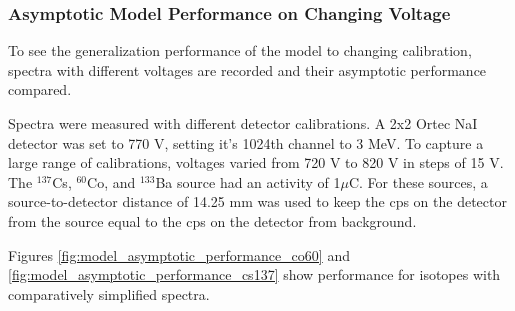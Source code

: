 \subsubsection{Asymptotic Model Performance on Changing Voltage}

To see the generalization performance of the model to changing calibration, spectra with different voltages are recorded and their asymptotic performance compared.

Spectra were measured with different detector calibrations. A 2x2 Ortec NaI detector was set to 770 V, setting it's 1024th channel to 3 MeV. To capture a large range of calibrations, voltages varied from 720 V to 820 V in steps of 15 V. The $^{137}$Cs, $^{60}$Co, and $^{133}$Ba source had an activity of 1$\mu$C. For these sources, a source-to-detector distance of 14.25 mm was used to keep the cps on the detector from the source equal to the cps on the detector from background.

Figures \ref{fig:model_asymptotic_performance_co60} and \ref{fig:model_asymptotic_performance_cs137} show performance for isotopes with comparatively simplified spectra.


